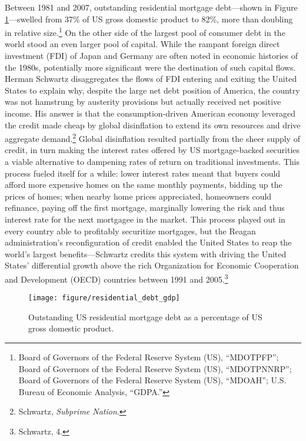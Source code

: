 \documentclass[
]{article}
\begin{document}
Between 1981 and 2007, outstanding residential mortgage debt---shown in Figure \ref{fig:hhdebt}---swelled from 37\% of US gross domestic product to 82\%, more than doubling in relative size.\footnote{Board of Governors of the Federal Reserve System (US), ``MDOTPFP''; Board of Governors of the Federal Reserve System (US), ``MDOTPNNRP''; Board of Governors of the Federal Reserve System (US), ``MDOAH''; U.S. Bureau of Economic Analysis, ``GDPA.''}
On the other side of the largest pool of consumer debt in the world stood an even larger pool of capital.
While the rampant foreign direct investment (FDI) of Japan and Germany are often noted in economic histories of the 1980s, potentially more significant were the destination of such capital flows.
Herman Schwartz disaggregates the flows of FDI entering and exiting the United States to explain why, despite the large net debt position of America, the country was not hamstrung by austerity provisions but actually received net positive income.
His answer is that the consumption-driven American economy leveraged the credit made cheap by global disinflation to extend its own resources and drive aggregate demand.\footnote{Schwartz, \emph{Subprime Nation}.}
Global disinflation resulted partially from the sheer supply of credit, in turn making the interest rates offered by US mortgage-backed securities a viable alternative to dampening rates of return on traditional investments.
This process fueled itself for a while: lower interest rates meant that buyers could afford more expensive homes on the same monthly payments, bidding up the prices of homes; when nearby home prices appreciated, homeowners could refinance, paying off the first mortgage, marginally lowering the risk and thus interest rate for the next mortgagee in the market.
This process played out in every country able to profitably securitize mortgages, but the Reagan administration's reconfiguration of credit enabled the United States to reap the world's largest benefits---Schwartz credits this system with driving the United States' differential growth above the rich Organization for Economic Cooperation and Development (OECD) countries between 1991 and 2005.\footnote{Schwartz, 4.}

\begin{figure}

{\centering \texttt{[image: figure/residential\_debt\_gdp]}

}

\caption{Outstanding US residential mortgage debt as a percentage of US gross domestic product.}\label{fig:hhdebt}
\end{figure}
\end{document}
